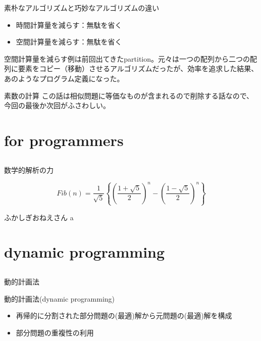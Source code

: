 \documentclass{beamer}
\subtitle{動的計画法}
\begin{document}
\begin{frame}[fragile]{}
\titlepage
\end{frame}

\begin{frame}[fragile]{素朴なアルゴリズムと巧妙なアルゴリズムの違い}{}
\begin{itemize}%
\item 時間計算量を減らす：無駄を省く
\item 空間計算量を減らす：無駄を省く
\end{itemize}

\vfill
空間計算量を減らす例は前回出てきたpartition。元々は一つの配列から二つの配列に要素をコピー（移動）させるアルゴリズムだったが、効率を追求した結果、あのようなプログラム定義になった。
\end{frame}

\begin{frame}[fragile]{素数の計算}{}
この話は相似問題に等価なものが含まれるので削除する話なので、今回の最後か次回がふさわしい。
\end{frame}

\section{for programmers}		%
\subsection{}

\begin{frame}[fragile]{数学的解析の力}{}

\[
Fib(n) = \frac{1}{\sqrt{5}}
\left\{
\left(\frac{1 + \sqrt{5}}{2}\right)^n
-
\left(\frac{1 - \sqrt{5}}{2}\right)^n
\right\}
\]

\end{frame}

\begin{frame}[fragile]{ふかしぎおねえさん}{}
a
\end{frame}

\section{dynamic programming}		%
\subsection{}

\begin{frame}[fragile]{動的計画法}{}
\begin{block}{動的計画法(dynamic programming)}
\begin{itemize}%
\item 再帰的に分割された部分問題の(最適)解から元問題の(最適)解を構成
\item 部分問題の重複性の利用
\end{itemize}
\end{block}

\end{frame}
\end{document}
